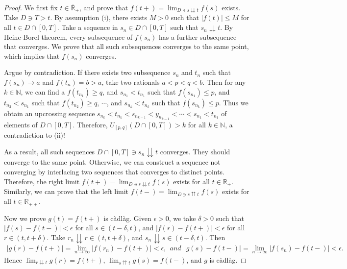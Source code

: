 \documentclass{article}
\numberwithin{equation}{section}
\theoremstyle{plain}
\theoremstyle{definition}
\begin{document}
\begin{proof}
We first fix $t\in\overline{\mathbb{R}}_+$, and prove that $f(t+)=\lim_{D\ni s\downdownarrows t}f(s)$ exists. Take $D\ni T>t$. By assumption (i), there exists $M>0$ such that $\vert f(t)\vert\leq M$ for all $t\in D\cap[0,T]$. Take a sequence in $s_n\in D\cap[0,T]$ such that $s_n\downdownarrows t$. By Heine-Borel theorem, every subsequence of $f(s_n)$ has a further subsequence that converges. We prove that all such subsequences converges to the same point, which implies that $f(s_n)$ converges.

Argue by contradiction. If there exists two subsequence $s_n$ and $t_n$ such that $f(s_n)\to a$ and $f(t_n)=b>a$, take two rationals $a<p<q<b$. Then for any $k\in\mathbb{N}$, we can find a $f(t_{n_1})\geq q$, and $s_{n_1}<t_{n_1}$ such that $f(s_{n_1})\leq p$, and $t_{n_2}<s_{n_1}$ such that $f(t_{n_2})\geq q$, $\cdots$, and $s_{n_k}<t_{n_k}$ such that $f(s_{n_k})\leq p$. Thus we obtain an upcrossing sequence $s_{n_k}<t_{n_k}<s_{n_{k-1}}<y_{n_{k-1}}<\cdots<s_{n_1}<t_{n_1}$
of elements of $D\cap[0,T]$. Therefore, $U_{[p,q]}(D\cap[0,T])>k$ for all $k\in\mathbb{N}$, a contradiction to (ii)!

As a result, all such sequences $D\cap[0,T]\ni s_n\downdownarrows t$ converges. They should converge to the same point. Otherwise, we can construct a sequence not converging by interlacing two sequences that converges to distinct points. Therefore, the right limit $f(t+)=\lim_{D\ni s\downdownarrows t}f(s)$ exists for all $t\in\mathbb{R}_+$. Similarly, we can prove that the left limit $f(t-)=\lim_{D\ni s\upuparrows t}f(s)$ exists for all $t\in\mathbb{R}_{++}$.\vspace{0.1cm}

Now we prove $g(t)=f(t+)$ is càdlàg. Given $\epsilon>0$, we take $\delta>0$ such that $\vert f(s)-f(t-)\vert <\epsilon$ for all $s\in(t-\delta,t)$, and $\vert f(r)-f(t+)\vert <\epsilon$ for all $r\in(t,t+\delta)$.  Take $r_n\downdownarrows r\in(t,t+\delta)$, and $s_n\downdownarrows s\in(t-\delta,t)$. Then
\begin{align*}
	\vert g(r)-f(t+)\vert = \lim_{n\to\infty}\vert f(r_n)-f(t+)\vert < \epsilon,\ \ \textit{and}\ \ \vert g(s)-f(t-)\vert = \lim_{n\to\infty}\vert f(s_n)-f(t-)\vert < \epsilon.
\end{align*}
Hence $\lim_{r\downdownarrows t}g(r)=f(t+)$, $\lim_{s\upuparrows t}g(s)=f(t-)$, and $g$ is càdlàg.
\end{proof}
\end{document}
